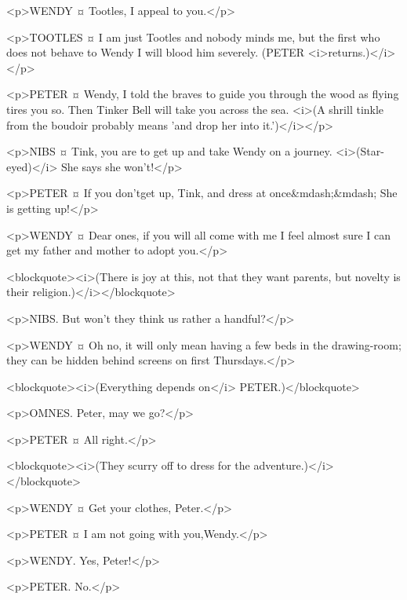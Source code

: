 <p>WENDY ¤
Tootles, I appeal to you.</p>

<p>TOOTLES ¤
I am just Tootles and nobody minds me, but the first who does not behave to Wendy I will blood him severely. (PETER <i>returns.)</i></p>

<p>PETER ¤
Wendy, I told the braves to guide you through the wood as flying tires you so. Then Tinker Bell will take you across the sea. <i>(A shrill tinkle from the boudoir probably means 'and drop her into it.')</i></p>

<p>NIBS ¤
Tink, you are to get up and take Wendy on a journey. <i>(Star-eyed)</i> She says she won't!</p>

<p>PETER ¤
If you don'tget up, Tink, and dress at once&mdash;&mdash; She is getting up!</p>

<p>WENDY ¤
Dear ones, if you will all come with me I feel almost sure I can get my father and mother to adopt you.</p>

<blockquote><i>(There is joy at this, not that they want parents, but novelty is their religion.)</i></blockquote>

<p>NIBS. But won't they think us rather a handful?</p>

<p>WENDY ¤
Oh no, it will only mean having a few beds in the drawing-room; they can be hidden behind screens on first Thursdays.</p>

<blockquote><i>(Everything depends on</i> PETER.)</blockquote>

<p>OMNES. Peter, may we go?</p>

<p>PETER ¤
All right.</p>

<blockquote><i>(They scurry off to dress for the adventure.)</i></blockquote>

<p>WENDY ¤
Get your clothes, Peter.</p>

<p>PETER ¤
I am not going with you,Wendy.</p>

<p>WENDY. Yes, Peter!</p>

<p>PETER. No.</p>

